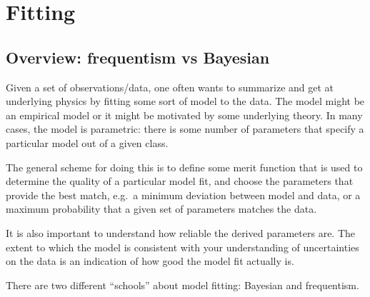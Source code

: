 \documentclass{article}
\begin{document}
\newpage
\section{Fitting}
\subsection{Overview: frequentism vs Bayesian}
Given a set of observations/data, one often wants to summarize and get at
underlying physics by fitting some sort of model to the data. The model
might be an empirical model or it might be motivated by some underlying
theory. In many cases, the model is parametric: there is some number of
parameters that specify a particular model out of a given class.

The general scheme for doing this is to define some merit function that is
used to determine the quality of a particular model fit, and choose the
parameters that provide the best match, e.g.\ a minimum deviation between
model and data, or a maximum probability that a given set of parameters
matches the data.

It is also important to understand how reliable
the derived parameters are.
The extent to which the model is consistent with your understanding of
uncertainties on the data is an indication of how good the model fit
actually is.

There are two different ``schools'' about model fitting: Bayesian and
frequentism.
\end{document}
